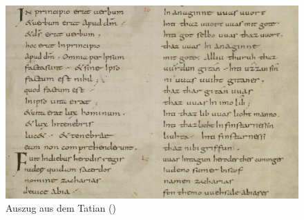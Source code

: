 \begin{figure}[h]
\begin{center}
  \includegraphics[width=10 cm]{images/tatian-handschrift-ausschnitt.jpg}
\caption {Auszug aus dem Tatian ()}
\label{abb:tatian-hand}
\end{center}
\end{figure} 



